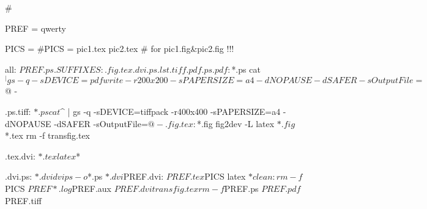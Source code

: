#

PREF = qwerty

PICS = 
#PICS = pic1.tex pic2.tex
#   for pic1.fig&pic2.fig !!!

all: ${PREF}.ps



.SUFFIXES: .fig .tex .dvi .ps .lst .tiff .pdf

.ps.pdf: $*.ps
	cat $^ | gs -q -sDEVICE=pdfwrite -r200x200 -sPAPERSIZE=a4 -dNOPAUSE -dSAFER -sOutputFile=$@ -

.ps.tiff: $*.ps
	cat $^ | gs -q -sDEVICE=tiffpack -r400x400 -sPAPERSIZE=a4 -dNOPAUSE -dSAFER -sOutputFile=$@ -

.fig.tex: $*.fig
	fig2dev -L latex $*.fig $*.tex
	rm -f transfig.tex

.tex.dvi: $*.tex
	latex $*

.dvi.ps: $*.dvi
	dvips -o $*.ps $*.dvi

${PREF}.dvi: ${PREF}.tex ${PICS}
	latex $*

clean:
	rm -f ${PICS} ${PREF}*.log ${PREF}.aux ${PREF}.dvi transfig.tex
	rm -f ${PREF}.ps ${PREF}.pdf ${PREF}.tiff

